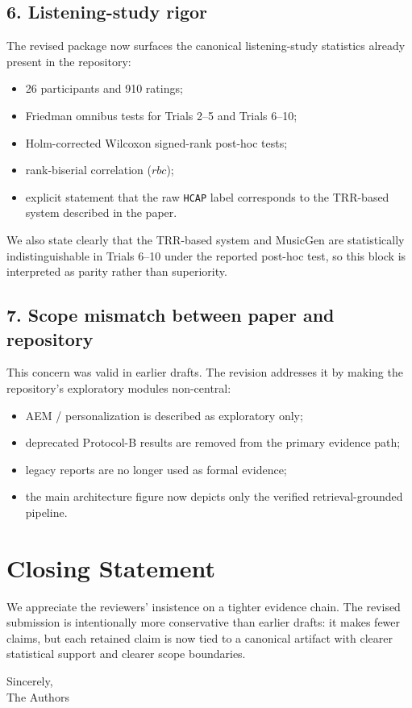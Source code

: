 \documentclass[11pt,a4paper]{article}
\begin{document}
\subsection*{6. Listening-study rigor}

The revised package now surfaces the canonical listening-study statistics already present in the repository:

\begin{itemize}[leftmargin=2em]
    \item 26 participants and 910 ratings;
    \item Friedman omnibus tests for Trials 2--5 and Trials 6--10;
    \item Holm-corrected Wilcoxon signed-rank post-hoc tests;
    \item rank-biserial correlation ($rbc$);
    \item explicit statement that the raw \texttt{HCAP} label corresponds to the TRR-based system described in the paper.
\end{itemize}

We also state clearly that the TRR-based system and MusicGen are statistically indistinguishable in Trials 6--10 under the reported post-hoc test, so this block is interpreted as parity rather than superiority.

\subsection*{7. Scope mismatch between paper and repository}

This concern was valid in earlier drafts. The revision addresses it by making the repository's exploratory modules non-central:

\begin{itemize}[leftmargin=2em]
    \item AEM / personalization is described as exploratory only;
    \item deprecated Protocol-B results are removed from the primary evidence path;
    \item legacy reports are no longer used as formal evidence;
    \item the main architecture figure now depicts only the verified retrieval-grounded pipeline.
\end{itemize}

\section*{Closing Statement}

We appreciate the reviewers' insistence on a tighter evidence chain. The revised submission is intentionally more conservative than earlier drafts: it makes fewer claims, but each retained claim is now tied to a canonical artifact with clearer statistical support and clearer scope boundaries.

\medskip

\noindent Sincerely,\\
The Authors
\end{document}
